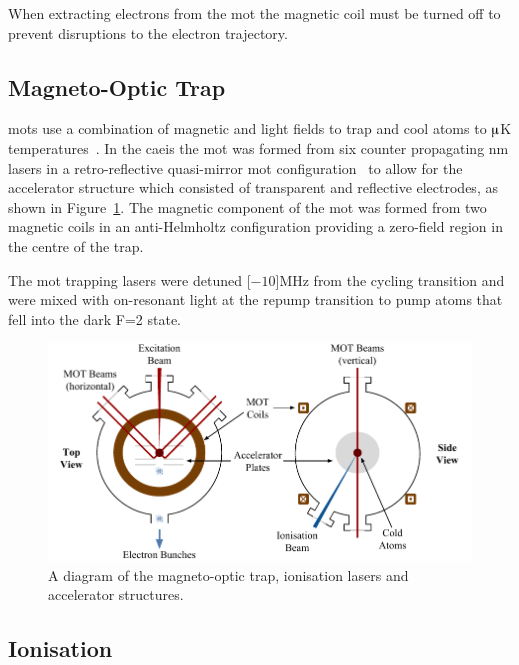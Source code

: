 When extracting electrons from the \gls{mot} the magnetic coil must be turned off to prevent disruptions to the electron trajectory.

\subsection{Magneto-Optic Trap}
\Glspl{mot} use a combination of magnetic and light fields to trap and cool atoms to $\muup$K temperatures~\cite{metcalf_laser_1999}.
In the \gls{caeis} the \gls{mot} was formed from six counter propagating \unit[780]{nm} lasers in a retro-reflective quasi-mirror \gls{mot} configuration~\cite{hanssen_using_2006,mcculloch_generation_2013} to allow for the accelerator structure which consisted of transparent and reflective electrodes, as shown in Figure~\ref{figure:mot}.
The magnetic component of the \gls{mot} was formed from two magnetic coils in an anti-Helmholtz configuration providing a zero-field region in the centre of the trap.

The \gls{mot} trapping lasers were detuned \unit[$-10$]{MHz} from the cycling transition and were mixed with on-resonant light at the repump transition to pump atoms that fell into the dark F=2 state.

\begin{figure}
    \center
    \includegraphics[width=145mm]{part2/Figs/MOTdiagram.pdf}
    \caption[A diagram of the magneto-optic trap.]{A diagram of the magneto-optic trap, ionisation lasers and accelerator structures.}
    \label{figure:mot}
\end{figure}

\subsection{Ionisation}\label{section:two_stage_ionisation}

